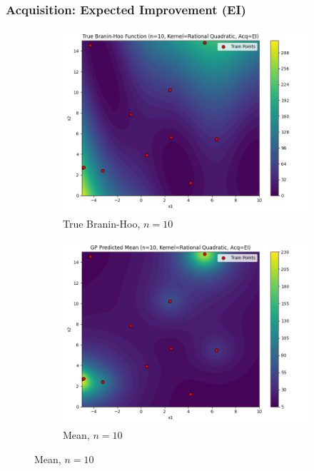 \documentclass[a4paper,12pt]{article}
\begin{document}
\subsubsection*{Acquisition: Expected Improvement (EI)}
\begin{figure}[H]
\centering
\begin{subfigure}{0.3\textwidth}
  \includegraphics[width=\linewidth]{Task-02/images/true_function_rational_quadratic_n10_EI.png}
  \caption{True Branin-Hoo, $n=10$}
\end{subfigure}
\begin{subfigure}{0.3\textwidth}
    \includegraphics[width=\linewidth]{Task-02/images/gp_mean_rational_quadratic_n10_EI.png}
    \caption{Mean, $n=10$}

\end{subfigure}
\end{figure}
\end{document}
